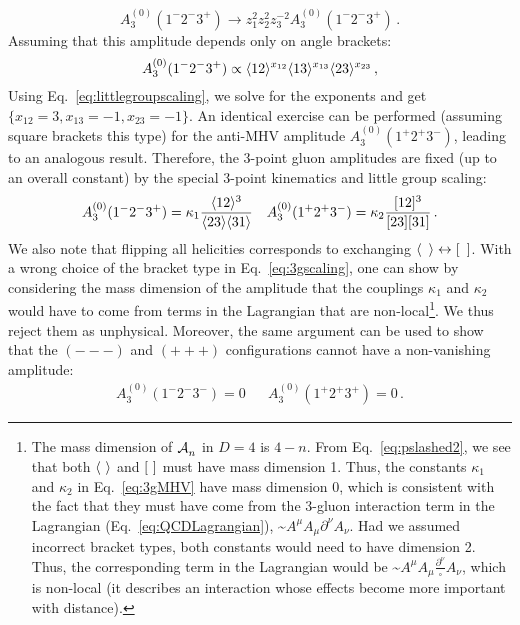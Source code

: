 \documentclass[main.tex]{subfiles}
\begin{document}
\begin{equation}
    A_3^{(0)} (1^-2^-3^+) \rightarrow z_1^2 z_2^2 z_3^{-2} A_3^{(0)}(1^-2^-3^+) \,.
\end{equation}
Assuming that this amplitude depends only on angle brackets:
\begin{equation} \label{eq:3gscaling}
    A_3^{(0)} (1^-2^-3^+) \propto \langle 12 \rangle^{x_{12}} \langle 13 \rangle^{x_{13}} \langle 23 \rangle^{x_{23}} \,,
\end{equation}
Using Eq.~\ref{eq:littlegroupscaling}, we solve for the exponents and get $\{x_{12} = 3, x_{13} = -1, x_{23} = -1\}$. An identical exercise can be performed (assuming square brackets this type) for the anti-MHV amplitude $A_3^{(0)} (1^+2^+3^-)$, leading to an analogous result. Therefore, the 3-point gluon amplitudes are fixed (up to an overall constant) by the special 3-point kinematics and little group scaling:
\begin{align} \label{eq:3gMHV}
    A_3^{(0)} (1^-2^-3^+) = \kappa_1 \frac{\langle 12 \rangle^3}{\langle 23 \rangle\langle 31 \rangle} && A_3^{(0)} (1^+2^+3^-) = \kappa_2 \frac{[ 12 ]^3}{[ 23 ][ 31 ]} \,.
\end{align}
We also note that flipping all helicities corresponds to exchanging $\langle \phantom{p} \rangle \leftrightarrow [ \phantom{p} ]$. With a wrong choice of the bracket type in Eq.~\ref{eq:3gscaling}, one can show by considering the mass dimension of the amplitude that the couplings $\kappa_1$ and $\kappa_2$ would have to come from terms in the Lagrangian that are non-local\footnote{The mass dimension of $\mathcal{A}_{n}^{}$ in $D=4$ is $4-n$. From Eq.~\ref{eq:pslashed2}, we see that both $\langle \phantom{i} \rangle$ and $\braketsq$ must have mass dimension 1. Thus, the constants $\kappa_1$ and $\kappa_2$ in Eq.~\ref{eq:3gMHV} have mass dimension 0, which is consistent with the fact that they must have come from the 3-gluon interaction term in the Lagrangian (Eq.~\ref{eq:QCDLagrangian}), \textasciitilde$A^\mu A_\mu \partial^\nu A_\nu$. Had we assumed incorrect bracket types, both constants would need to have dimension 2. Thus, the corresponding term in the Lagrangian would be \textasciitilde$A^\mu A_\mu \frac{\partial^\nu}{\square} A_\nu$, which is non-local (it describes an interaction whose effects become more important with distance).}. We thus reject them as unphysical. Moreover, the same argument can be used to show that the $(---)$ and $(+++)$ configurations cannot have a non-vanishing amplitude:
\begin{align}
    A_3^{(0)} (1^-2^-3^-) = 0 && A_3^{(0)} (1^+2^+3^+) = 0\,.
\end{align}
\end{document}
